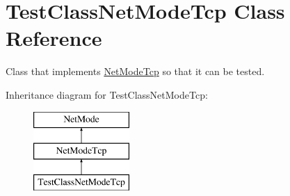 \hypertarget{class_test_class_net_mode_tcp}{
\section{TestClassNetModeTcp Class Reference}
\label{class_test_class_net_mode_tcp}
}


Class that implements \hyperlink{class_net_mode_tcp}{NetModeTcp} so that it can be tested.  


Inheritance diagram for TestClassNetModeTcp:\begin{figure}[H]
\begin{center}
\leavevmode
\includegraphics[height=3.000000cm]{class_test_class_net_mode_tcp}
\end{center}
\end{figure}
